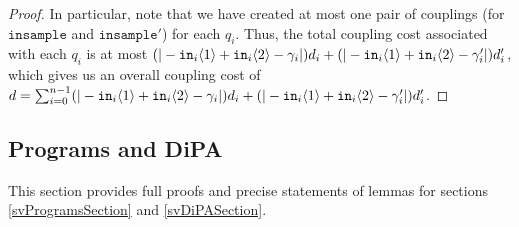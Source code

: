 \begin{proof}
    In particular, note that we have created at most one pair of couplings (for $\texttt{insample}$ and $\texttt{insample}'$) for each $q_i$. Thus, the total coupling cost associated with each $q_i$ is at most $(|-\texttt{in}_i\langle1 \rangle+\texttt{in}_i\langle2 \rangle-\gamma_i|)d_i+(|-\texttt{in}_i\langle1 \rangle+\texttt{in}_i\langle2 \rangle-\gamma_i'|)d_i'$, 
    which gives us an overall coupling cost of $d = \sum_{i=0}^{n-1}(|-\texttt{in}_i\langle1 \rangle+\texttt{in}_i\langle2 \rangle-\gamma_i|)d_i+(|-\texttt{in}_i\langle1 \rangle+\texttt{in}_i\langle2 \rangle-\gamma_i'|)d_i'$.
\end{proof}




\subsection{Programs and DiPA}

This section provides full proofs and precise statements of lemmas for sections \ref{svProgramsSection} and \ref{svDiPASection}.


